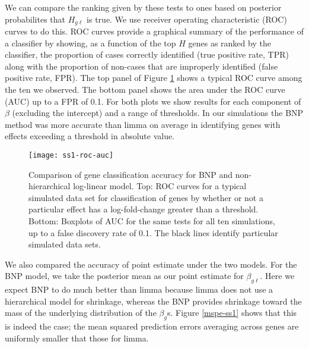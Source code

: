 We can compare the ranking given by these tests to ones based on posterior probabilites that $H_{g\ell}$ is true. We use receiver operating characteristic (ROC) curves to do this. ROC curves provide a graphical summary of the performance of a classifier by showing, as a function of the top $H$ genes as ranked by the classifier, the proportion of cases correctly identified (true positive rate, TPR) along with the proportion of non-cases that are improperly identified (false positive rate, FPR). The top panel of Figure \ref{roc-ss1} shows a typical ROC curve among the ten we observed. The bottom panel shows the area under the ROC curve (AUC) up to a FPR of 0.1. For both plots we show results for each component of $\beta$ (excluding the intercept) and a range of thresholds. In our simulations the BNP method was more accurate than limma on average in identifying genes with effects exceeding a threshold in absolute value.

% 
\begin{figure}[ht!]
\centering
\texttt{[image: ss1-roc-auc]}
\begin{minipage}{.8\textwidth}
\caption{Comparison of gene classification accuracy for BNP and non-hierarchical log-linear model. \small Top: ROC curves for a typical simulated data set for classification of genes by whether or not a particular effect has a log-fold-change greater than a threshold. Bottom: Boxplots of AUC for the same tests for all ten simulations, up to a false discovery rate of 0.1. The black lines identify particular simulated data sets.}
\label{roc-ss1}
\end{minipage}
\end{figure}

We also compared the accuracy of point estimate under the two models. For the BNP model, we take the posterior mean as our point estimate for $\beta_{g\ell}$. Here we expect BNP to do much better than limma because limma does not use a hierarchical model for shrinkage, whereas the BNP provides shrinkage toward the mass of the underlying distribution of the $\beta_g$s. Figure \ref{mspe-ss1} shows that this is indeed the case; the mean squared prediction errors averaging across genes are uniformly smaller that those for limma.

